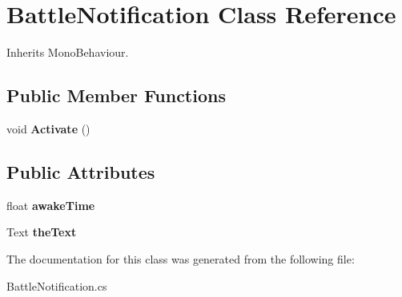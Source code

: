 \hypertarget{class_battle_notification}{}\section{Battle\+Notification Class Reference}
\label{class_battle_notification}


Inherits Mono\+Behaviour.

\subsection*{Public Member Functions}
\begin{DoxyCompactItemize}
\item 
\mbox{\label{class_battle_notification_a0834b9810dc6e6298fda15a2c5fd3de5}} 
void {\bfseries Activate} ()
\end{DoxyCompactItemize}
\subsection*{Public Attributes}
\begin{DoxyCompactItemize}
\item 
\mbox{\label{class_battle_notification_ac7b4faee5c6293d50dbfbe4f17aa5ec9}} 
float {\bfseries awake\+Time}
\item 
\mbox{\label{class_battle_notification_a31535a5713a62bad20c04e2bc9d2834f}} 
Text {\bfseries the\+Text}
\end{DoxyCompactItemize}


The documentation for this class was generated from the following file\+:\begin{DoxyCompactItemize}
\item 
Battle\+Notification.\+cs\end{DoxyCompactItemize}
